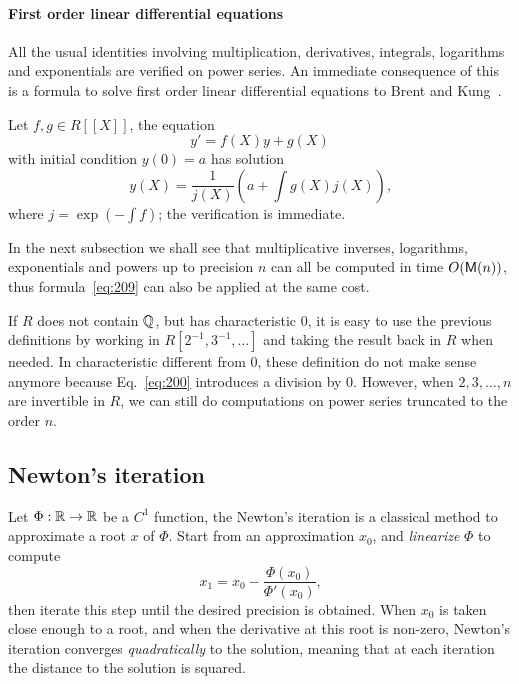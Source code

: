 \paragraph{First order linear differential equations}
\label{sec:first-order-linear}
All the usual identities involving multiplication, derivatives,
integrals, logarithms and exponentials are verified on power
series. An immediate consequence of this is a formula to solve first
order linear differential equations to Brent and
Kung~\cite{brent+kung}.

Let $f,g\in
R[[X]]$, the equation
\begin{equation}
  \label{eq:208}
  y' = f(X)y + g(X)
\end{equation}
with initial condition $y(0)=a$ has solution
\begin{equation}
  \label{eq:209}
  y(X) =  \frac{1}{j(X)}\left( a + \int g(X)j(X)\right)
  \text{,}
\end{equation}
where $j = \exp(-\int f)$; the verification is immediate.

In the next subsection we shall see that multiplicative inverses,
logarithms, exponentials and powers up to precision $n$ can all be
computed in time $O(\mathsf{M}(n))$, thus formula~\eqref{eq:209} can also
be applied at the same cost.


\begin{nota}
  If $R$ does not contain $\mathbb{Q}$, but has characteristic $0$, it is easy
  to use the previous definitions by working in
  $R[2^{-1},3^{-1},\ldots]$ and taking the result back in $R$ when
  needed. In characteristic different from $0$, these definition do
  not make sense anymore because Eq.~\eqref{eq:200} introduces a
  division by $0$. However, when $2,3,\ldots,n$ are invertible in $R$,
  we can still do computations on power series truncated to the order
  $n$.
\end{nota}


\subsection{Newton's iteration}
\label{sec:newtons-iteration}
Let $\Phi:\mathbb{R}\rightarrow\mathbb{R}$ be a $C^1$ function, the
Newton's iteration is a classical method to
approximate a root $x$ of $\Phi$. Start from an approximation $x_0$, and
\emph{linearize} $\Phi$ to compute
\begin{equation}
  \label{eq:192}
  x_1 = x_0 - \frac{\Phi(x_0)}{\Phi'(x_0)}
  \text{,}
\end{equation}
then iterate this step until the desired precision is obtained. When
$x_0$ is taken close enough to a root, and when the derivative at this
root is non-zero, Newton's iteration converges \emph{quadratically} to
the solution, meaning that at each iteration the distance to the
solution is squared.

